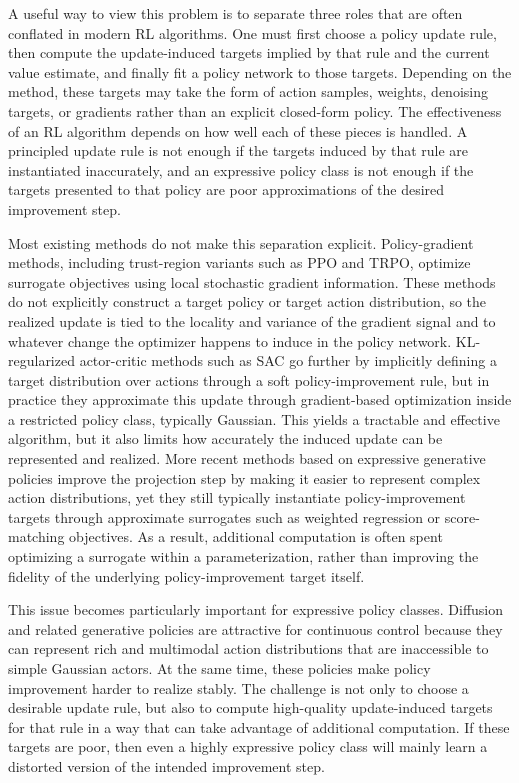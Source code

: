 \documentclass{article}
\theoremstyle{plain}
\theoremstyle{definition}
\theoremstyle{remark}
\begin{document}
A useful way to view this problem is to separate three roles that are often conflated in modern RL algorithms. One must first choose a policy update rule, then compute the update-induced targets implied by that rule and the current value estimate, and finally fit a policy network to those targets. Depending on the method, these targets may take the form of action samples, weights, denoising targets, or gradients rather than an explicit closed-form policy. The effectiveness of an RL algorithm depends on how well each of these pieces is handled. A principled update rule is not enough if the targets induced by that rule are instantiated inaccurately, and an expressive policy class is not enough if the targets presented to that policy are poor approximations of the desired improvement step.

Most existing methods do not make this separation explicit. Policy-gradient methods, including trust-region variants such as PPO and TRPO, optimize surrogate objectives using local stochastic gradient information. These methods do not explicitly construct a target policy or target action distribution, so the realized update is tied to the locality and variance of the gradient signal and to whatever change the optimizer happens to induce in the policy network. KL-regularized actor-critic methods such as SAC go further by implicitly defining a target distribution over actions through a soft policy-improvement rule, but in practice they approximate this update through gradient-based optimization inside a restricted policy class, typically Gaussian. This yields a tractable and effective algorithm, but it also limits how accurately the induced update can be represented and realized. More recent methods based on expressive generative policies improve the projection step by making it easier to represent complex action distributions, yet they still typically instantiate policy-improvement targets through approximate surrogates such as weighted regression or score-matching objectives. As a result, additional computation is often spent optimizing a surrogate within a parameterization, rather than improving the fidelity of the underlying policy-improvement target itself.

This issue becomes particularly important for expressive policy classes. Diffusion and related generative policies are attractive for continuous control because they can represent rich and multimodal action distributions that are inaccessible to simple Gaussian actors. At the same time, these policies make policy improvement harder to realize stably. The challenge is not only to choose a desirable update rule, but also to compute high-quality update-induced targets for that rule in a way that can take advantage of additional computation. If these targets are poor, then even a highly expressive policy class will mainly learn a distorted version of the intended improvement step.
\end{document}
